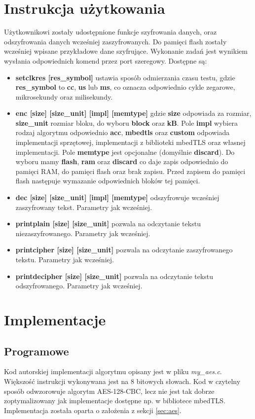 \documentclass[a4paper, 10pt]{article}
\begin{document}
	\section{Instrukcja użytkowania}
	Użytkownikowi zostały udostępnione funkcje szyfrowania danych, oraz odszyfrowania danych wcześniej zaszyfrowanych. Do pamięci flash zostały wcześniej wpisane przykładowe dane szyfrujące. Wykonanie zadań jest wynikiem wysłania odpowiednich komend przez port szeregowy. Dostępne są:
	\begin{itemize}
	\item \textbf{setclkres [res\_symbol]} ustawia sposób odmierzania czasu testu, gdzie \textbf{res\_symbol} to \textbf{cc}, \textbf{us} lub \textbf{ms}, co oznacza odpowiednio cykle zegarowe, mikrosekundy oraz milisekundy.
	\item \textbf{enc [size] [size\_unit] [impl] [memtype]} gdzie \textbf{size} odpowiada za rozmiar, \textbf{size\_unit} rozmiar bloku, do wyboru \textbf{block} oraz \textbf{kB}. Pole \textbf{impl} wybiera rodzaj algorytmu odpowiednio \textbf{acc}, \textbf{mbedtls} oraz \textbf{custom} odpowiada implementacji sprzętowej, implementacji z biblioteki mbedTLS oraz własnej implementacji. Pole \textbf{memtype} jest opcjonalne (domyślnie \textbf{discard}). Do wyboru mamy  \textbf{flash}, \textbf{ram} oraz \textbf{discard} co daje zapis odpowiednio do pamięci RAM, do pamięci flash oraz brak zapisu. Przed zapisem do pamięci flash następuje wymazanie odpowiednich bloków tej pamięci.
	\item \textbf{dec [size] [size\_unit] [impl] [memtype]} odszyfrowuje wcześniej zaszyfrowany tekst. Parametry jak wcześniej.
	\item \textbf{printplain [size] [size\_unit]} pozwala na odczytanie tekstu niezaszyfrowanego. Parametry jak wcześniej. 
	\item \textbf{printcipher [size] [size\_unit]} pozwala na odczytanie zaszyfrowanego tekstu. Parametry jak wcześniej. 
	\item \textbf{printdecipher [size] [size\_unit]} pozwala na odczytanie tekstu odszyfrowanego. Parametry jak wcześniej.
	\end{itemize}
	\section{Implementacje}
	\subsection{Programowe}
	Kod autorskiej implementacji algorytmu opisany jest w pliku \textit{my\_aes.c}. Większość instrukcji wykonywana jest na 8 bitowych słowach. Kod w czytelny sposób odwzorowuje algorytm AES-128-CBC, lecz nie jest tak dobrze zoptymalizowany jak implementacje dostępne np. w bibliotece mbedTLS. Implementacja została oparta o założenia z sekcji \ref{sec:aes}.
\end{document}

